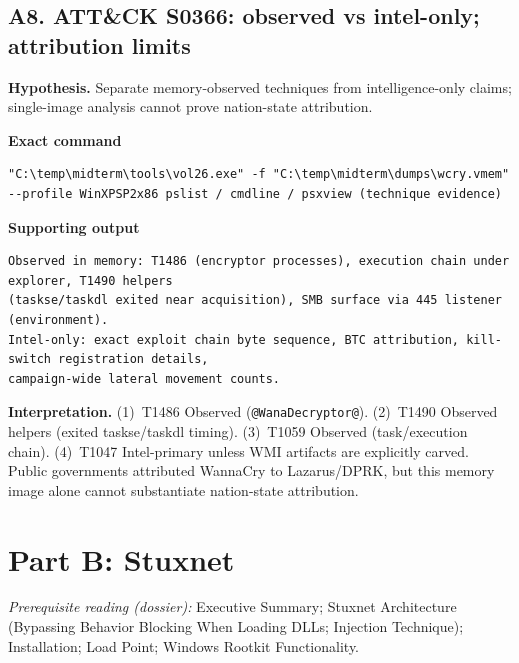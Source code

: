 \documentclass[11pt,letterpaper]{article}
\begin{document}
\subsection*{A8. ATT\&CK S0366: observed vs intel-only; attribution limits}
\textbf{Hypothesis.} Separate memory-observed techniques from intelligence-only claims; single-image analysis cannot prove nation-state attribution.
\par\medskip\noindent\textbf{Exact command}
\begin{lstlisting}
"C:\temp\midterm\tools\vol26.exe" -f "C:\temp\midterm\dumps\wcry.vmem" --profile WinXPSP2x86 pslist / cmdline / psxview (technique evidence)
\end{lstlisting}
\noindent\textbf{Supporting output}
\begin{lstlisting}
Observed in memory: T1486 (encryptor processes), execution chain under explorer, T1490 helpers
(taskse/taskdl exited near acquisition), SMB surface via 445 listener (environment).
Intel-only: exact exploit chain byte sequence, BTC attribution, kill-switch registration details,
campaign-wide lateral movement counts.
\end{lstlisting}
\noindent\textbf{Interpretation.} (1)~T1486 Observed (\texttt{@WanaDecryptor@}). (2)~T1490 Observed helpers (exited taskse/taskdl timing). (3)~T1059 Observed (task/execution chain). (4)~T1047 Intel-primary unless WMI artifacts are explicitly carved. Public governments attributed WannaCry to Lazarus/DPRK, but this memory image alone cannot substantiate nation-state attribution.
\vspace{0.55em}

\section*{Part B: Stuxnet}
\textit{Prerequisite reading (dossier):} Executive Summary; Stuxnet Architecture (Bypassing Behavior Blocking When Loading DLLs; Injection Technique); Installation; Load Point; Windows Rootkit Functionality.
\end{document}
